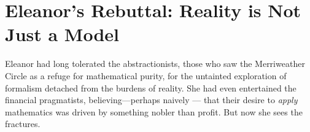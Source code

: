 % 
% 
% 
% 
% 
% 
% 
% 
% 
% 
% 
% 
% 
% 
% 
% 
% 
% 
% 
% 
% 
% 
\section*{Eleanor’s Rebuttal: Reality is Not Just a Model}

Eleanor had long tolerated the abstractionists, those who saw the Merriweather Circle as a refuge for mathematical purity, for the untainted exploration of formalism detached from the burdens of reality. She had even entertained the financial pragmatists, believing—perhaps naively — that their desire to \textit{apply} mathematics was driven by something nobler than profit. But now she sees the fractures.

